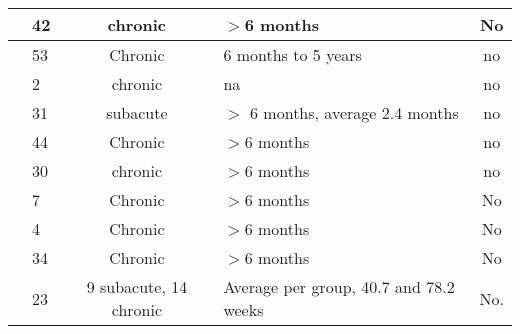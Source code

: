 \begin{longtable}{|p{3cm}||p{2cm}|c|p{3cm}|c|}
	\hline
	\cite{Wu2012} & 42 & chronic & $>$6 months & No \bigstrut\\
	\hline
	\cite{Wu2013} & 53 & Chronic  & 6 months to 5 years & no \bigstrut\\
	\hline
	\cite{Barsotti2016} & 2  & chronic & na & no \bigstrut\\
	\hline
	\cite{Hsieh2017}& 31 & subacute & $>$ 6 months, average 2.4 months & no \bigstrut\\
	\hline
	\cite{Hung2019} & 44 & Chronic & $>$6 months & no \bigstrut\\
	\hline
	\cite{Hung2019b} & 30 & chronic & $>$6 months & no \bigstrut\\
	\hline
	\cite{Chen2016} & 7  & Chronic & $>$6 months & No \bigstrut\\
	\hline
	\cite{Squeri2009} & 4  & Chronic & $>$6 months & No \bigstrut\\
	\hline
	\cite{Hsieh2017} & 34 & Chronic  & $>$6 months & No \bigstrut\\
	\hline
	\cite{Straudi2016} & 23 & 9 subacute, 14 chronic & Average per group, 40.7 and 78.2 weeks & No. \bigstrut\\
	\hline
\end{longtable}

\endgroup
\restoregeometry
